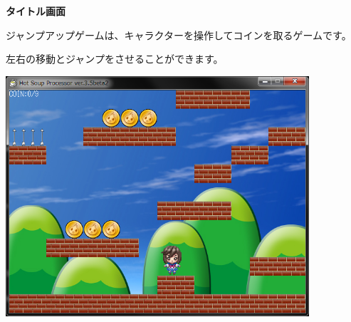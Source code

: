 \documentclass[a4paper,dvipdfmx]{jarticle}
\begin{document}
{\bfseries
タイトル画面}


\bigskip


\bigskip


\bigskip


\bigskip

ジャンプアップゲームは、キャラクターを操作してコインを取るゲームです。

左右の移動とジャンプをさせることができます。


\bigskip


\bigskip



\begin{center}
\includegraphics[width=11.28cm,height=8.915cm]{text04-img/text04-img023.png}

\end{center}

\bigskip


\bigskip


\bigskip


\bigskip


\bigskip


\bigskip


\bigskip


\bigskip


\bigskip


\bigskip


\bigskip


\bigskip


\bigskip


\bigskip


\bigskip


\bigskip


\bigskip
\end{document}
